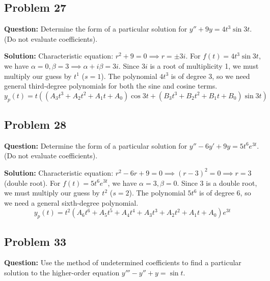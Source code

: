 \documentclass[12pt]{article}
\begin{document}
\subsection{Problem 27}
\textbf{Question:} Determine the form of a particular solution for $y'' + 9y = 4t^3 \sin 3t$. (Do not evaluate coefficients).

\textbf{Solution:}
Characteristic equation: $r^2 + 9 = 0 \implies r = \pm 3i$.
For $f(t) = 4t^3 \sin 3t$, we have $\alpha = 0, \beta = 3 \implies \alpha + i\beta = 3i$.
Since $3i$ is a root of multiplicity 1, we must multiply our guess by $t^1$ ($s=1$).
The polynomial $4t^3$ is of degree 3, so we need general third-degree polynomials for both the sine and cosine terms.
\[ y_p(t) = t \left( (A_3 t^3 + A_2 t^2 + A_1 t + A_0)\cos 3t + (B_3 t^3 + B_2 t^2 + B_1 t + B_0)\sin 3t \right) \]

\subsection{Problem 28}
\textbf{Question:} Determine the form of a particular solution for $y'' - 6y' + 9y = 5t^6 e^{3t}$. (Do not evaluate coefficients).

\textbf{Solution:}
Characteristic equation: $r^2 - 6r + 9 = 0 \implies (r-3)^2 = 0 \implies r = 3$ (double root).
For $f(t) = 5t^6 e^{3t}$, we have $\alpha = 3, \beta = 0$.
Since $3$ is a double root, we must multiply our guess by $t^2$ ($s=2$).
The polynomial $5t^6$ is of degree 6, so we need a general sixth-degree polynomial.
\[ y_p(t) = t^2 (A_6 t^6 + A_5 t^5 + A_4 t^4 + A_3 t^3 + A_2 t^2 + A_1 t + A_0) e^{3t} \]

\subsection{Problem 33}
\textbf{Question:} Use the method of undetermined coefficients to find a particular solution to the higher-order equation $y''' - y'' + y = \sin t$.
\end{document}
